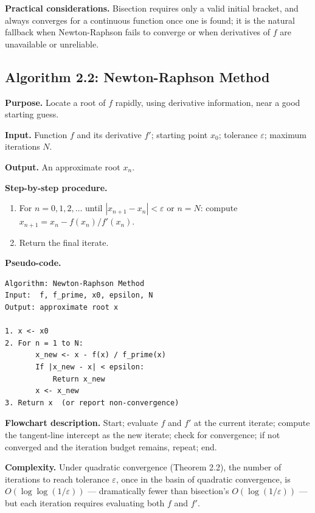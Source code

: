 \documentclass[
]{article}
\providecommand{\tightlist}{%
  \setlength{\itemsep}{0pt}\setlength{\parskip}{0pt}}
\begin{document}
\textbf{Practical considerations.} Bisection requires only a valid
initial bracket, and always converges for a continuous function once one
is found; it is the natural fallback when Newton-Raphson fails to
converge or when derivatives of \(f\) are unavailable or unreliable.

\subsection{Algorithm 2.2: Newton-Raphson
Method}\label{algorithm-2.2-newton-raphson-method}

\textbf{Purpose.} Locate a root of \(f\) rapidly, using derivative
information, near a good starting guess.

\textbf{Input.} Function \(f\) and its derivative \(f'\); starting point
\(x_0\); tolerance \(\varepsilon\); maximum iterations \(N\).

\textbf{Output.} An approximate root \(x_n\).

\textbf{Step-by-step procedure.}

\begin{enumerate}
\def\labelenumi{\arabic{enumi}.}
\tightlist
\item
  For \(n=0,1,2,\dots\) until \(|x_{n+1}-x_n|<\varepsilon\) or \(n=N\):
  compute \(x_{n+1} = x_n - f(x_n)/f'(x_n)\).
\item
  Return the final iterate.
\end{enumerate}

\textbf{Pseudo-code.}

\begin{verbatim}
Algorithm: Newton-Raphson Method
Input:  f, f_prime, x0, epsilon, N
Output: approximate root x

1. x <- x0
2. For n = 1 to N:
       x_new <- x - f(x) / f_prime(x)
       If |x_new - x| < epsilon:
           Return x_new
       x <- x_new
3. Return x  (or report non-convergence)
\end{verbatim}

\textbf{Flowchart description.} Start; evaluate \(f\) and \(f'\) at the
current iterate; compute the tangent-line intercept as the new iterate;
check for convergence; if not converged and the iteration budget
remains, repeat; end.

\textbf{Complexity.} Under quadratic convergence (Theorem 2.2), the
number of iterations to reach tolerance \(\varepsilon\), once in the
basin of quadratic convergence, is \(O(\log\log(1/\varepsilon))\) ---
dramatically fewer than bisection's \(O(\log(1/\varepsilon))\) --- but
each iteration requires evaluating both \(f\) and \(f'\).
\end{document}
